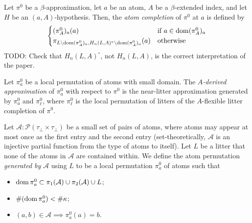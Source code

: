 \documentclass{article}
\begin{document}
\begin{definition}
    Let \( \pi^0 \) be a \( \beta \)-approximation, let \( a \) be an atom, \( A \) be a \( \beta \)-extended index, and let \( H \) be an \( (a, A) \)-hypothesis.
    Then, the \emph{atom completion} of \( \pi^0 \) at \( a \) is defined by
    \[ \begin{cases}
        (\pi^0_A)_a(a) & \text{if } a \in \operatorname{dom} (\pi^0_A)_a \\
        \pi_{L \setminus \operatorname{dom} (\pi^0_A)_a, H_n(L, A)^\circ \setminus \operatorname{dom} (\pi^0_A)_a}(a) & \text{otherwise}
    \end{cases} \]
    TODO: Check that \( H_n(L, A)^\circ \), not \( H_n(L, A) \), is the correct interpretation of the paper.
\end{definition}
\begin{definition}
    Let \( \pi^0_a \) be a local permutation of atoms with small domain.
    The \emph{\( A \)-derived approximation} of \( \pi^0_a \) with respect to \( \pi^0 \) is the near-litter approximation generated by \( \pi^0_a \) and \( \pi^0_\ell \), where \( \pi^0_\ell \) is the local permutation of litters of the \( A \)-flexible litter completion of \( \pi^0 \).
\end{definition}
\begin{definition}
    Let \( \mathcal A \colon \mathcal P (\tau_\bot \times \tau_\bot) \) be a small set of pairs of atoms, where atoms may appear at most once as the first entry and the second entry (set-theoretically, \( \mathcal A \) is an injective partial function from the type of atoms to itself).
    Let \( L \) be a litter that none of the atoms in \( \mathcal A \) are contained within.
    We define the atom permutation \emph{generated by} \( \mathcal A \) using \( L \) to be a local permutation \( \pi^0_a \) of atoms such that
    \begin{itemize}
        \item \( \operatorname{dom} \pi^0_a \subset \pi_1(\mathcal A) \cup \pi_2(\mathcal A) \cup L \);
        \item \( \#(\operatorname{dom} \pi^0_a) < \#\kappa \);
        \item \( (a, b) \in \mathcal A \implies \pi^0_a(a) = b \).
    \end{itemize}
\end{definition}
\end{document}
